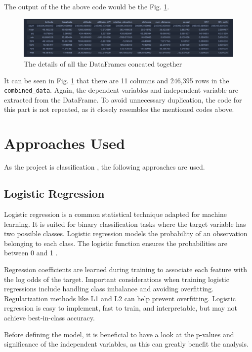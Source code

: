 The output of the the above code would be the Fig. \ref{fig:df_describe}.

\begin{figure}[htb]
	\includegraphics[width=\textwidth]{resources/df_describe.png}
	\caption{The details of all the DataFrames concated together}
	\label{fig:df_describe}
\end{figure}

It can be seen in Fig. \ref{fig:df_describe} that there are 11 columns 
and 246,395 rows in the \texttt{combined\_data}.
Again, the dependent variables and independent variable are extracted from the DataFrame.
To avoid unnecessary duplication, the code for this part is not repeated, as it closely resembles the mentioned codes above.

\section{Approaches Used}
\label{sec:model-approaches}

As the project is classification \cite{osisanwo2017supervised}, the following approaches are used.

\subsection{Logistic Regression}
Logistic regression is a common statistical technique adapted for machine learning. It is suited for binary classification tasks where the target variable has two possible classes. Logistic regression models the probability of an observation belonging to each class. The logistic function ensures the probabilities are between 0 and 1 \cite{hosmer2013applied}.

Regression coefficients are learned during training to associate each feature with the log odds of the target. Important considerations when training logistic regressions include handling class imbalance and avoiding overfitting. Regularization methods like L1 and L2 can help prevent overfitting. Logistic regression is easy to implement, fast to train, and interpretable, but may not achieve best-in-class accuracy.

Before defining the model, it is beneficial to have a look at the p-values and significance of the independent variables, as this can greatly benefit the analysis.

